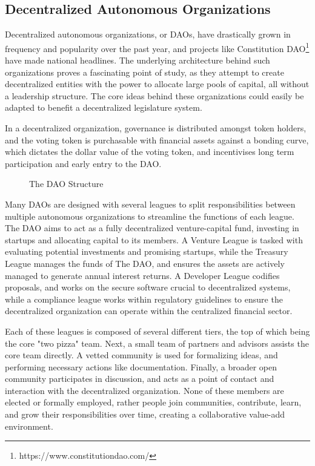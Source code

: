 \documentclass[letterpaper,twocolumn]{article}
\begin{document}
\subsection*{Decentralized Autonomous Organizations}
Decentralized autonomous organizations, or DAOs, have drastically grown in frequency and popularity over the past year, and projects like Constitution DAO\footnote{https://www.constitutiondao.com/} have made national headlines.  The underlying architecture behind such organizations proves a fascinating point of study, as they attempt to create decentralized entities with the power to allocate large pools of capital, all without a leadership structure.  The core ideas behind these organizations could easily be adapted to benefit a decentralized legislature system.  

In a decentralized organization, governance is distributed amongst token holders, and the voting token is purchasable with financial assets against a bonding curve, which dictates the dollar value of the voting token, and incentivises long term participation and early entry to the DAO. 

\begin{figure}[h!]
	\caption{The DAO Structure} \label{fig:THE_DAO_Structure}
\end{figure}

Many DAOs are designed with several leagues to split responsibilities between multiple autonomous organizations to streamline the functions of each league\cite{DAO_Whitepaper}.  The DAO aims to act as a fully decentralized venture-capital fund, investing in startups and allocating capital to its members.  A Venture League is tasked with evaluating potential investments and promising startups, while the Treasury League manages the funds of The DAO, and ensures the assets are actively managed to generate annual interest returns.  A Developer League codifies proposals, and works on the secure software crucial to decentralized systems, while a compliance league works within regulatory guidelines to ensure the decentralized organization can operate within the centralized financial sector.  

Each of these leagues is composed of several different tiers, the top of which being the core "two pizza" team.  Next, a small team of partners and advisors assists the core team directly.  A vetted community is used for formalizing ideas, and performing necessary actions like documentation.  Finally, a broader open community participates in discussion, and acts as a point of contact and interaction with the decentralized organization\cite{DAO_Whitepaper}.  None of these members are elected or formally employed, rather people join communities, contribute, learn, and grow their responsibilities over time, creating a collaborative value-add environment.
\end{document}
